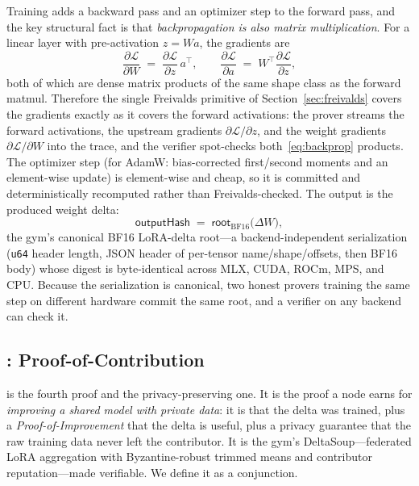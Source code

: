 Training adds a backward pass and an optimizer step to the forward pass, and the
key structural fact is that \emph{backpropagation is also matrix multiplication}.
For a linear layer with pre-activation $z = W a$, the gradients are
\begin{equation}
\label{eq:backprop}
\frac{\partial \mathcal{L}}{\partial W} \;=\; \frac{\partial \mathcal{L}}{\partial z}\, a^{\!\top},
\qquad
\frac{\partial \mathcal{L}}{\partial a} \;=\; W^{\!\top} \frac{\partial \mathcal{L}}{\partial z},
\end{equation}
both of which are dense matrix products of the same shape class as the forward
matmul. Therefore the single Freivalds primitive of Section~\ref{sec:freivalds}
covers the gradients exactly as it covers the forward activations: the prover
streams the forward activations, the upstream gradients
$\partial\mathcal{L}/\partial z$, and the weight gradients
$\partial\mathcal{L}/\partial W$ into the trace, and the verifier spot-checks
both~\eqref{eq:backprop} products. The optimizer step (for AdamW: bias-corrected
first/second moments and an element-wise update) is element-wise and cheap, so it is
committed and deterministically recomputed rather than Freivalds-checked. The output
is the produced weight delta:
\begin{equation}
\mathsf{outputHash} \;=\; \mathsf{root}_{\mathrm{BF16}}\bigl(\Delta W\bigr),
\end{equation}
the gym's canonical BF16 LoRA-delta root---a backend-independent serialization
(\texttt{u64} header length, JSON header of per-tensor name/shape/offsets, then BF16
body) whose digest is byte-identical across MLX, CUDA, ROCm, MPS, and CPU. Because
the serialization is canonical, two honest provers training the same step on
different hardware commit the same root, and a verifier on any backend can check it.

\subsection{\PoC{}: Proof-of-Contribution}
\label{sec:poc}

\PoC{} is the fourth proof and the privacy-preserving one. It is the proof a node
earns for \emph{improving a shared model with private data}: it is \PoT{} that the
delta was trained, plus a \emph{Proof-of-Improvement} that the delta is useful, plus
a privacy guarantee that the raw training data never left the contributor. It is the
gym's DeltaSoup---federated LoRA aggregation with Byzantine-robust trimmed means and
contributor reputation---made verifiable. We define it as a conjunction.

